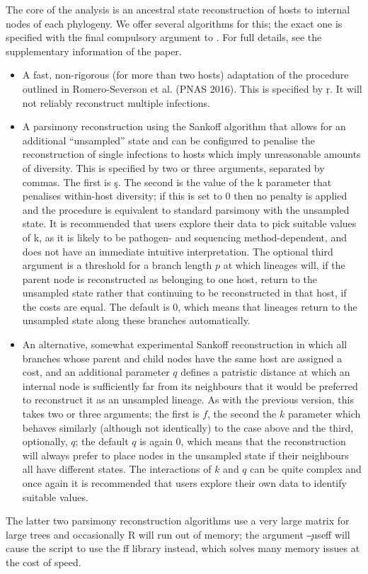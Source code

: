 The core of the \pat analysis is an ancestral state reconstruction of hosts to internal nodes of each phylogeny.
We offer several algorithms for this; the exact one is specified with the final compulsory argument to \pat.
For full details, see the supplementary information of the \p paper.
\begin{itemize}
\item A fast, non-rigorous (for more than two hosts) adaptation of the procedure outlined in Romero-Severson et al. (PNAS 2016).
This is specified by \c{r}.
It will not reliably reconstruct multiple infections.
\item A parsimony reconstruction using the Sankoff algorithm that allows for an additional ``unsampled'' state and can be configured to penalise the reconstruction of single infections to hosts which imply unreasonable amounts of diversity.
This is specified by two or three arguments, separated by commas.
The first is \c{s}.
The second is the value of the k parameter that penalises within-host diversity; if this is set to 0 then no penalty is applied and the procedure is equivalent to standard parsimony with the unsampled state.
It is recommended that users explore their data to pick suitable values of k, as it is likely to be pathogen- and sequencing method-dependent, and does not have an immediate intuitive interpretation.
The optional third argument is a threshold for a branch length $p$ at which lineages will, if the parent node is reconstructed as belonging to one host, return to the unsampled state rather that continuing to be reconstructed in that host, if the costs are equal.
The default is 0, which means that lineages return to the unsampled state along these branches automatically.
\item An alternative, somewhat experimental Sankoff reconstruction in which all branches whose parent and child nodes have the same host are assigned a cost, and an additional parameter $q$ defines a patristic distance at which an internal node is sufficiently far from its neighbours that it would be preferred to reconstruct it as an unsampled lineage.
As with the previous version, this takes two or three arguments; the first is $f$, the second the $k$ parameter which behaves similarly (although not identically) to the case above and the third, optionally, $q$; the default $q$ is again 0, which means that the reconstruction will always prefer to place nodes in the unsampled state if their neighbours all have different states.
The interactions of $k$ and $q$ can be quite complex and once again it is recommended that users explore their own data to identify suitable values.
\end{itemize}
The latter two parsimony reconstruction algorithms use a very large matrix for large trees and occasionally R will run out of memory; the argument \c{--useff} will cause the script to use the ff library instead, which solves many memory issues at the cost of speed.

